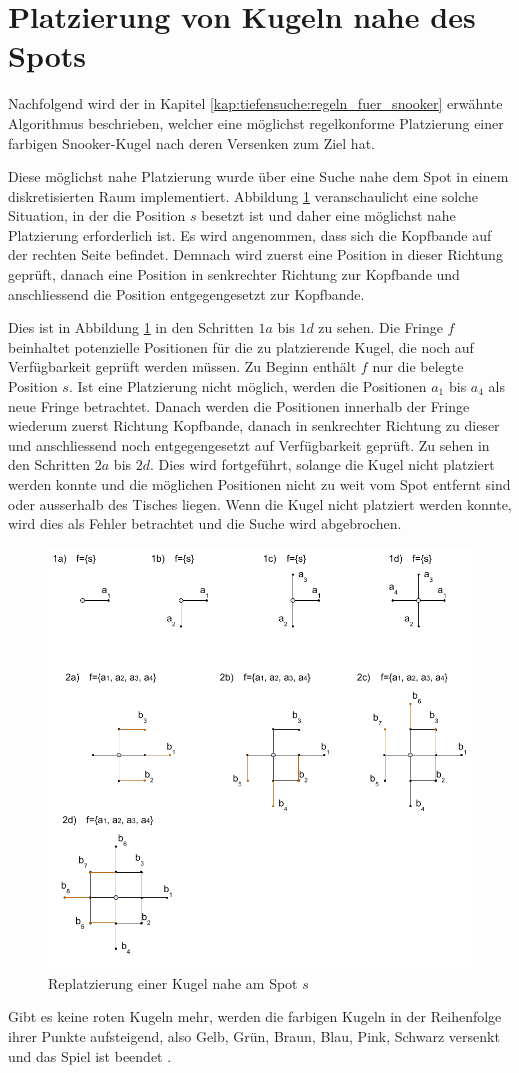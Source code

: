 \section{Platzierung von Kugeln nahe des Spots}\label{anhang:spot_platzierung}
Nachfolgend wird der in Kapitel \ref{kap:tiefensuche:regeln_fuer_snooker} erwähnte Algorithmus beschrieben, welcher eine möglichst regelkonforme Platzierung einer
farbigen Snooker-Kugel nach deren Versenken zum Ziel hat.

Diese möglichst nahe Platzierung wurde über eine Suche nahe dem Spot in einem diskretisierten Raum implementiert.
Abbildung \ref{fig:snooker_spot_replacement} veranschaulicht eine solche Situation, in der die Position $s$ besetzt
ist und daher eine möglichst nahe Platzierung erforderlich ist.
Es wird angenommen, dass sich die Kopfbande auf der rechten Seite befindet. Demnach wird zuerst eine Position in dieser
Richtung geprüft, danach eine Position in senkrechter Richtung zur Kopfbande und anschliessend die Position entgegengesetzt
zur Kopfbande.

Dies ist in Abbildung \ref{fig:snooker_spot_replacement} in den Schritten $1a$ bis $1d$ zu sehen.
Die Fringe $f$ beinhaltet potenzielle Positionen für die zu platzierende Kugel, die noch auf Verfügbarkeit geprüft werden müssen.
Zu Beginn enthält $f$ nur die belegte Position $s$.
Ist eine Platzierung nicht möglich, werden die Positionen $a_1$ bis $a_4$ als neue Fringe betrachtet. Danach werden die Positionen
innerhalb der Fringe wiederum zuerst Richtung Kopfbande, danach in senkrechter Richtung zu dieser und anschliessend noch entgegengesetzt
auf Verfügbarkeit geprüft. Zu sehen in den Schritten $2a$ bis $2d$. Dies wird fortgeführt, solange die Kugel nicht platziert
werden konnte und die möglichen Positionen nicht zu weit vom Spot entfernt sind oder ausserhalb des Tisches liegen.
Wenn die Kugel nicht platziert werden konnte, wird dies als Fehler betrachtet und die Suche wird abgebrochen.

\begin{figure}[h!]
    \begin{center}
        \includegraphics[width=0.6\linewidth]{../common/03_billiard_ai/resources/40_replatzierung_kugel.png}
    \end{center}
    \caption{Replatzierung einer Kugel nahe am Spot $s$}
    \label{fig:snooker_spot_replacement}
\end{figure}

Gibt es keine roten Kugeln mehr, werden die farbigen Kugeln in der Reihenfolge ihrer Punkte aufsteigend,
also Gelb, Grün, Braun, Blau, Pink, Schwarz versenkt und das Spiel ist beendet \cite{stoppball:spielregel:snooker}.
